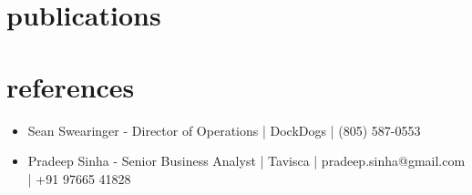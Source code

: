 \documentclass[letterpaper]{twentysecondcv} %
\begin{document}

\section{publications}

\begin{twentyshort} %
\end{twentyshort}







\section{references}


   \begin{itemize}
	\item Sean Swearinger - Director of Operations | DockDogs | (805) 587-0553
    \item Pradeep Sinha - Senior Business Analyst | Tavisca | pradeep.sinha@gmail.com | +91 97665 41828
\end{itemize}
\end{document}
